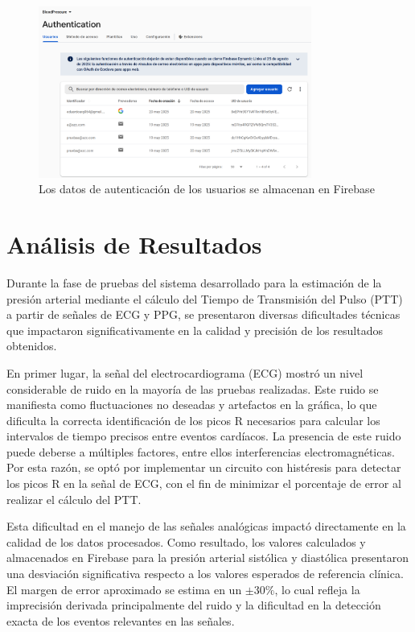     \begin{figure}[H]
        \centering
        \includegraphics[width=0.8\textwidth]{img/Resultados/firebase_auth.png}
        \caption[Los datos de autenticación de los usuarios se almacenan en Firebase.]{Los datos de autenticación de los usuarios se almacenan en Firebase\footnotemark}
        \label{fig:Firebase_auth}
    \end{figure}

\newpage
\section{Análisis de Resultados}

    Durante la fase de pruebas del sistema desarrollado para la estimación de la presión arterial mediante el cálculo del Tiempo de Transmisión del Pulso (PTT) a partir de señales de ECG y PPG, se presentaron diversas dificultades técnicas que impactaron significativamente en la calidad y precisión de los resultados obtenidos.

    En primer lugar, la señal del electrocardiograma (ECG) mostró un nivel considerable de ruido en la mayoría de las pruebas realizadas. Este ruido se manifiesta como fluctuaciones no deseadas y artefactos en la gráfica, lo que dificulta la correcta identificación de los picos R necesarios para calcular los intervalos de tiempo precisos entre eventos cardíacos. La presencia de este ruido puede deberse a múltiples factores, entre ellos interferencias electromagnéticas. Por esta razón, se optó por implementar un circuito con histéresis para detectar los picos R en la señal de ECG, con el fin de minimizar el porcentaje de error al realizar el cálculo del PTT.

    Esta dificultad en el manejo de las señales analógicas impactó directamente en la calidad de los datos procesados. Como resultado, los valores calculados y almacenados en Firebase para la presión arterial sistólica y diastólica presentaron una desviación significativa respecto a los valores esperados de referencia clínica. El margen de error aproximado se estima en un $\pm30\%$, lo cual refleja la imprecisión derivada principalmente del ruido y la dificultad en la detección exacta de los eventos relevantes en las señales.

